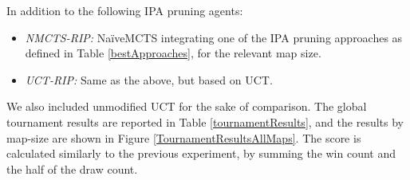 \documentclass[conference]{IEEEtran}
\begin{document}
In addition to the following IPA pruning agents:

\begin{itemize}
\item \textit{NMCTS-RIP:} NaïveMCTS integrating one of the IPA pruning approaches as defined in Table \ref{bestApproaches}, for the relevant map size.
\item \textit{UCT-RIP:} Same as the above, but based on UCT.
\end{itemize}

We also included unmodified UCT for the sake of comparison. The global tournament results are reported in Table \ref{tournamentResults}, and the results by map-size are shown in Figure \ref{TournamentResultsAllMaps}. The score is calculated similarly to the previous experiment, by summing the win count and the half of the draw count.
\end{document}
